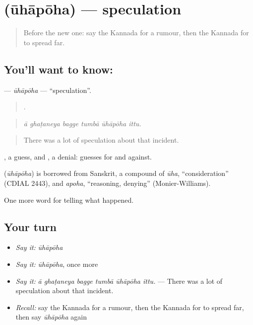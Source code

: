 \section[\texorpdfstring{\kn{ಊಹಾಪೋಹ} (ūhāpōha)}{ಊಹಾಪೋಹ (ūhāpōha)}]{ (ūhāpōha) — speculation}

\label{lesson:KA-C338-uhapoha}



\begin{quote}
Before the new one: say the Kannada for a rumour, then the Kannada for to spread far.
\end{quote}

\subsection*{You'll want to know: }
\textbf{} — \emph{ūhāpōha} — \textquotedblleft{}speculation\textquotedblright{}.

\begin{quote}
     .
\end{quote}

\begin{quote}
\emph{ā ghaṭaneya bagge tumbā ūhāpōha ittu.}
\end{quote}

\begin{quote}
There was a lot of speculation about that incident.
\end{quote}

, a guess, and , a denial: guesses for and against.

\begin{cousinweb}
\textbf{} (\emph{ūhāpōha}) is borrowed from Sanskrit, a compound of \emph{ūha}, \textquotedblleft{}consideration\textquotedblright{} (CDIAL 2443), and \emph{apoha}, \textquotedblleft{}reasoning, denying\textquotedblright{} (Monier-Williams).
\end{cousinweb}

\begin{grammarlens}[title={What you've built}]
One more word for telling what happened.
\end{grammarlens}

\subsection*{Your turn}
\begin{itemize}
\raggedright
  \item \emph{Say it:} \emph{ūhāpōha}
  \item \emph{Say it:} \emph{ūhāpōha}, once more
  \item \emph{Say it:} \emph{ā ghaṭaneya bagge tumbā ūhāpōha ittu.} — There was a lot of speculation about that incident.
  \item \emph{Recall:} say the Kannada for a rumour, then the Kannada for to spread far, then say \emph{ūhāpōha} again
\end{itemize}

